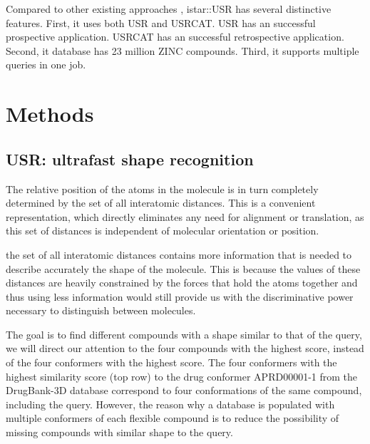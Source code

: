 Compared to other existing approaches \citep{1333,1334,1335,1337,1338,1331}, istar::USR has several distinctive features. First, it uses both USR and USRCAT. USR has an successful prospective application. USRCAT has an successful retrospective application. Second, it database has 23 million ZINC compounds. Third, it supports multiple queries in one job.

\section{Methods}

\subsection{USR: ultrafast shape recognition}

The relative position of the atoms in the molecule is in turn completely determined by the set of all interatomic distances. This is a convenient representation, which directly eliminates any need for alignment or translation, as this set of distances is independent of molecular orientation or position.

the set of all interatomic distances contains more information that is needed to describe accurately the shape of the molecule. This is because the values of these distances are heavily constrained by the forces that hold the atoms together and thus using less information would still provide us with the discriminative power necessary to distinguish between molecules.

The goal is to find different compounds with a shape similar to that of the query, we will direct our attention to the four compounds with the highest score, instead of the four conformers with the highest score. The four conformers with the highest similarity score (top row) to the drug conformer APRD00001-1 from the DrugBank-3D database correspond to four conformations of the same compound, including the query. However, the reason why a database is populated with multiple conformers of each flexible compound is to reduce the possibility of missing compounds with similar shape to the query.

